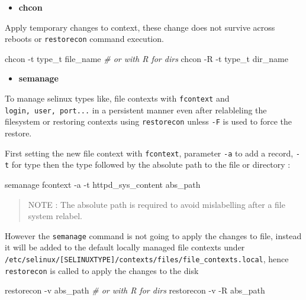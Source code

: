 \documentclass[
  14pt,
  english,
  a4paper,
]{scrreprt}
\newenvironment{Shaded}{}{}
\newcommand{\CommentTok}[1]{\textcolor[rgb]{0.38,0.63,0.69}{\textit{#1}}}
\newcommand{\ExtensionTok}[1]{#1}
\newcommand{\NormalTok}[1]{#1}
\providecommand{\tightlist}{%
  \setlength{\itemsep}{0pt}\setlength{\parskip}{0pt}}
\begin{document}
\begin{itemize}
\tightlist
\item
  \textbf{chcon}
\end{itemize}

Apply temporary changes to context, these change does not survive across
reboots or \texttt{restorecon} command execution.

\begin{Shaded}
\begin{Highlighting}[]
\ExtensionTok{chcon}\NormalTok{ {-}t type\_t file\_name}
\CommentTok{\# or with \textquotesingle{}{-}R\textquotesingle{} for dirs}
\ExtensionTok{chcon}\NormalTok{ {-}R {-}t type\_t dir\_name}
\end{Highlighting}
\end{Shaded}

\begin{itemize}
\tightlist
\item
  \textbf{semanage}
\end{itemize}

To manage selinux types like, file contexts with \texttt{fcontext} and
\texttt{login,\ user,\ port...} in a persistent manner even after
relableling the filesystem or restoring contexts using
\texttt{restorecon} unless \texttt{-F} is used to force the restore.

First setting the new file context with \texttt{fcontext}, parameter
\texttt{-a} to add a record, \texttt{-t} for type then the type followed
by the absolute path to the file or directory :

\begin{Shaded}
\begin{Highlighting}[]
\ExtensionTok{semanage}\NormalTok{ fcontext {-}a {-}t httpd\_sys\_content abs\_path}
\end{Highlighting}
\end{Shaded}

\begin{quote}
NOTE : The absolute path is required to avoid mislabelling after a file
system relabel.
\end{quote}

However the \texttt{semanage} command is not going to apply the changes
to file, instead it will be added to the default locally managed file
contexts under
\texttt{/etc/selinux/{[}SELINUXTYPE{]}/contexts/files/file\_contexts.local},
hence \texttt{restorecon} is called to apply the changes to the disk

\begin{Shaded}
\begin{Highlighting}[]
\ExtensionTok{restorecon}\NormalTok{ {-}v abs\_path}
\CommentTok{\# or with \textquotesingle{}{-}R\textquotesingle{} for dirs}
\ExtensionTok{restorecon}\NormalTok{ {-}v {-}R abs\_path}
\end{Highlighting}
\end{Shaded}
\end{document}
